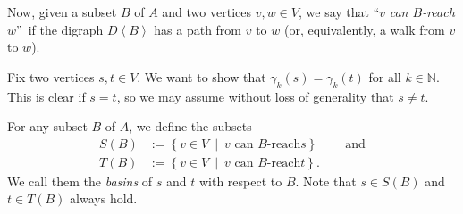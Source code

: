 \documentclass[numbers=enddot,12pt,final,onecolumn,notitlepage]{scrartcl}%
\theoremstyle{definition}
\newtheorem{remk}[theo]{Remark}
\newenvironment{remark}[1][]
{\begin{remk}[#1]\begin{leftbar}}
{\end{leftbar}\end{remk}}
\theoremstyle{plainsl}
\begin{document}


Now, given a subset $B$ of $A$ and two vertices $v,w\in V$, we say that
\textquotedblleft$v$ \emph{can $B$-reach} $w$\textquotedblright\ if the digraph
$D\left\langle B\right\rangle $ has a path from $v$ to $w$ (or, equivalently,
a walk from $v$ to $w$).

Fix two vertices $s,t\in V$. We want to show that $\gamma_{k}\left(  s\right)
=\gamma_{k}\left(  t\right)  $ for all $k\in\mathbb{N}$. This is clear if
$s=t$, so we may assume without loss of generality that $s\neq t$.

For any subset $B$ of $A$, we define the subsets%
\begin{align*}
S\left(  B\right)   &  :=\left\{  v\in V\ \mid\ v\text{ can }B\text{-reach
}s\right\}  \ \ \ \ \ \ \ \ \ \ \text{and}\\
T\left(  B\right)   &  :=\left\{  v\in V\ \mid\ v\text{ can }B\text{-reach
}t\right\}  .
\end{align*}
We call them the \emph{basins} of $s$ and $t$ with respect to $B$. Note that
$s\in S\left(  B\right)  $ and $t\in T\left(  B\right)  $ always hold.
\end{document}
